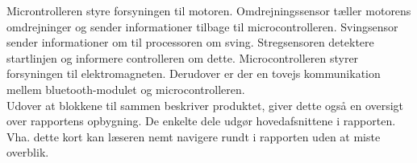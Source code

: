Microntrolleren styre forsyningen til motoren. Omdrejningssensor tæller motorens omdrejninger og sender informationer tilbage til microcontrolleren. Svingsensor sender informationer om til processoren om sving. Stregsensoren detektere startlinjen og informere controlleren om dette. Microcontrolleren styrer forsyningen til elektromagneten. Derudover er der en tovejs kommunikation mellem bluetooth-modulet og microcontrolleren. \\
Udover at blokkene til sammen beskriver produktet, giver dette også en oversigt over rapportens opbygning. De enkelte dele udgør hovedafsnittene i rapporten. Vha. dette kort kan læseren nemt navigere rundt i rapporten uden at miste overblik. 